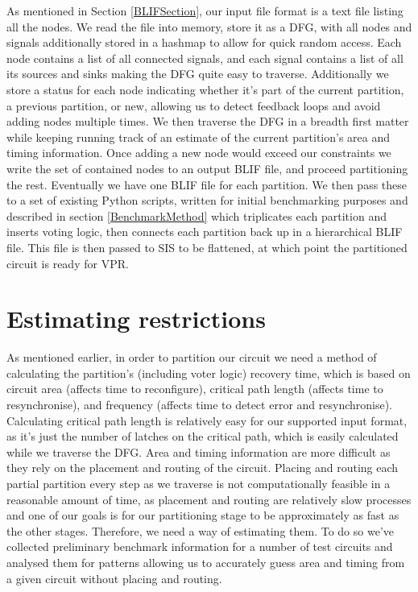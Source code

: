\documentclass[12pt,drafta4paper,oneside]{memoir} %
\begin{document}
As mentioned in Section \ref{BLIFSection}, our input file format is a text file listing all the nodes. We read the file into memory, store it as a \ac{DFG}, with all nodes and signals additionally stored in a hashmap to allow for quick random access. Each node contains a list of all connected signals, and each signal contains a list of all its sources and sinks making the \ac{DFG} quite easy to traverse. Additionally we store a status for each node indicating whether it's part of the current partition, a previous partition, or new, allowing us to detect feedback loops and avoid adding nodes multiple times.
We then traverse the \ac{DFG} in a breadth first matter while keeping running track of an estimate of the current partition's area and timing information. Once adding a new node would exceed our constraints we write the set of contained nodes to an output \ac{BLIF} file, and proceed partitioning the rest. Eventually we have one \ac{BLIF} file for each partition. We then pass these to a set of existing Python scripts, written for initial benchmarking purposes and described in section \ref{BenchmarkMethod} which triplicates each partition and inserts voting logic, then connects each partition back up in a hierarchical \ac{BLIF} file. This file is then passed to \ac{SIS} to be flattened, at which point the partitioned circuit is ready for \ac{VPR}.


\section{Estimating restrictions}
As mentioned earlier, in order to partition our circuit we need a method of calculating the partition's (including voter logic) recovery time, which is based on circuit area (affects time to reconfigure), critical path length (affects time to resynchronise), and frequency (affects time to detect error and resynchronise). Calculating critical path length is relatively easy for our supported input format, as it's just the number of latches on the critical path, which is easily calculated while we traverse the \ac{DFG}.
Area and timing information are more difficult as they rely on the placement and routing of the circuit. Placing and routing each partial partition every step as we traverse is not computationally feasible in a reasonable amount of time, as placement and routing are relatively slow processes and one of our goals is for our partitioning stage to be approximately as fast as the other stages. Therefore, we need a way of estimating them. To do so we've collected preliminary benchmark information for a number of test circuits and analysed them for patterns allowing us to accurately guess area and timing from a given circuit without placing and routing.
\end{document}
